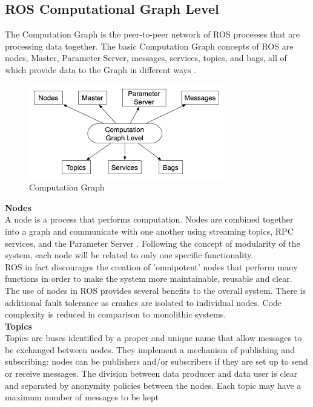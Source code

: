 \newpage

\subsection{ROS Computational Graph Level}
The Computation Graph is the peer-to-peer network of ROS processes that are processing data together. The basic Computation Graph concepts of ROS are nodes, Master, Parameter Server, messages, services, topics, and bags, all of which provide data to the Graph in different ways \citet{rosconcepts}.\\
\begin{figure}[H]
    \centering
    \includegraphics{Images/Chapter 1/computationgraph.png}
    \caption{Computation Graph}
    \label{fig:computationgraph}
\end{figure}
\textbf{Nodes}\\
A node is a process that performs computation. Nodes are combined together into a graph and communicate with one another using streaming topics, RPC services, and the Parameter Server \citet{rosnodes}. Following the concept of modularity of the system, each node will be related to only one specific functionality.\\ ROS in fact
discourages the creation of 'omnipotent' nodes that perform many functions in order to make the system more maintainable, reusable and clear.\\
The use of nodes in ROS provides several benefits to the overall system. There is additional fault tolerance as crashes are isolated to individual nodes. Code complexity is reduced in comparison to monolithic systems.\\
\newpage
\textbf{Topics}\\
Topics are buses identified by a proper and unique name that allow messages to be exchanged between nodes. They implement a mechanism
of publishing and subscribing: nodes can be publishers and/or subscribers if they are set up to send or receive messages. The division between
data producer and data user is clear and separated by anonymity policies
between the nodes. Each topic may have a maximum number of messages to be kept
